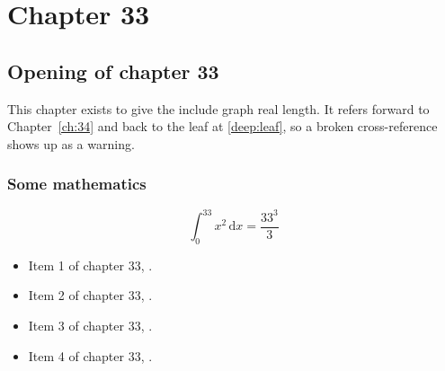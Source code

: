 \chapter{Chapter 33}
\label{ch:33}
\section{Opening of chapter 33}
This chapter exists to give the include graph real length. It refers
forward to Chapter~\ref{ch:34} and back to the leaf
at \ref{deep:leaf}, so a broken cross-reference shows up as a warning.

\subsection{Some mathematics}
\begin{equation}
  \int_0^{33} x^{2} \, \mathrm{d}x = \frac{33^{3}}{3}
\end{equation}

\begin{itemize}
  \item Item 1 of chapter 33, .
  \item Item 2 of chapter 33, .
  \item Item 3 of chapter 33, .
  \item Item 4 of chapter 33, .
\end{itemize}
